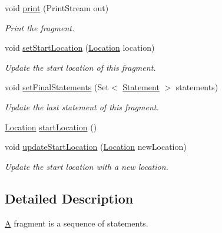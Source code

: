 \begin{DoxyCompactItemize}
void \hyperlink{interfaceedu_1_1udel_1_1cis_1_1vsl_1_1civl_1_1model_1_1IF_1_1Fragment_af1fac34a0205651a00d2799c79f79349}{print} (Print\+Stream out)
\begin{DoxyCompactList}\small\item\em Print the fragment. \end{DoxyCompactList}\item 
void \hyperlink{interfaceedu_1_1udel_1_1cis_1_1vsl_1_1civl_1_1model_1_1IF_1_1Fragment_a5299f8b352e04a6391f30fdf7f14fbd6}{set\+Start\+Location} (\hyperlink{interfaceedu_1_1udel_1_1cis_1_1vsl_1_1civl_1_1model_1_1IF_1_1location_1_1Location}{Location} location)
\begin{DoxyCompactList}\small\item\em Update the start location of this fragment. \end{DoxyCompactList}\item 
void \hyperlink{interfaceedu_1_1udel_1_1cis_1_1vsl_1_1civl_1_1model_1_1IF_1_1Fragment_ac80765bc3bdf0d0d80684e1ae10b1c6d}{set\+Final\+Statements} (Set$<$ \hyperlink{interfaceedu_1_1udel_1_1cis_1_1vsl_1_1civl_1_1model_1_1IF_1_1statement_1_1Statement}{Statement} $>$ statements)
\begin{DoxyCompactList}\small\item\em Update the last statement of this fragment. \end{DoxyCompactList}\item 
\hyperlink{interfaceedu_1_1udel_1_1cis_1_1vsl_1_1civl_1_1model_1_1IF_1_1location_1_1Location}{Location} \hyperlink{interfaceedu_1_1udel_1_1cis_1_1vsl_1_1civl_1_1model_1_1IF_1_1Fragment_a12a4d1d1497967e39b2aece98d1eb8c0}{start\+Location} ()
\item 
void \hyperlink{interfaceedu_1_1udel_1_1cis_1_1vsl_1_1civl_1_1model_1_1IF_1_1Fragment_a52ff0c0da400ffef60f84eb1dfd419a1}{update\+Start\+Location} (\hyperlink{interfaceedu_1_1udel_1_1cis_1_1vsl_1_1civl_1_1model_1_1IF_1_1location_1_1Location}{Location} new\+Location)
\begin{DoxyCompactList}\small\item\em Update the start location with a new location. \end{DoxyCompactList}\end{DoxyCompactItemize}


\subsection{Detailed Description}
\hyperlink{structA}{A} fragment is a sequence of statements. 


